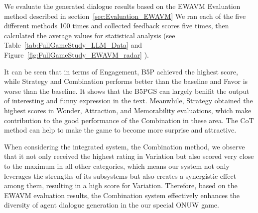 We evaluate the generated dialogue results based on the EWAVM Evaluation method described in section~\ref{sec:Evaluation_EWAVM} We ran each of the five different methods 100 times and collected feedback scores five times, then calculated the average values for statistical analysis (see Table~\ref{tab:FullGameStudy_LLM_Data} and Figure~\ref{fig:FullGameStudy_EWAVM_radar} ). 

It can be seen that in terms of Engagement, B5P achieved the highest score, while Strategy and Combination performs better than the baseline and Favor is worse than the baseline. It shows that the B5PGS can largely benifit the output of interesting and funny expression in the text. Meanwhile, Strategy obtained the highest scores in Wonder, Attraction, and Memorability evaluations, which make contribution to the good performance of the Combination in these area. The CoT method can help to make the game to become more surprise and attractive. 

When considering the integrated system, the Combination method, we observe that it not only received the highest rating in Variation but also scored very close to the maximum in all other categories, which means our system not only leverages the strengths of its subsystems but also creates a synergistic effect among them, resulting in a high score for Variation. Therefore, based on the EWAVM evaluation results, the Combination system effectively enhances the diversity of agent dialogue generation in the our special ONUW game.
